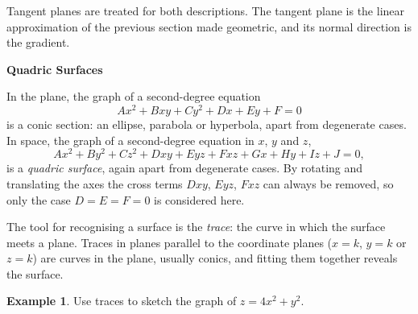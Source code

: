 \documentclass[11pt,a4paper]{article}
\theoremstyle{definition}
\newtheorem{exa}[thm]{Example}
\newcommand{\subhead}[1]{%
  \par\medskip\noindent\textbf{#1}\par\nobreak\smallskip}
\begin{document}
Tangent planes are treated for both descriptions. The tangent plane is the
linear approximation of the previous section made geometric, and its normal
direction is the gradient.

\subhead{Quadric Surfaces}

In the plane, the graph of a second-degree equation
\[Ax^2 + Bxy + Cy^2 + Dx + Ey + F = 0\]
is a conic section: an ellipse, parabola or hyperbola, apart from degenerate
cases. In space, the graph of a second-degree equation in $x$, $y$ and $z$,
\[Ax^2 + By^2 + Cz^2 + Dxy + Eyz + Fxz + Gx + Hy + Iz + J =0,\]
is a \emph{quadric surface}, again apart from degenerate cases. By rotating and
translating the axes the cross terms $Dxy$, $Eyz$, $Fxz$ can always be removed,
so only the case $D = E = F = 0$ is considered here.

The tool for recognising a surface is the \emph{trace}: the curve in which the
surface meets a plane. Traces in planes parallel to the coordinate planes
($x = k$, $y = k$ or $z = k$) are curves in the plane, usually conics, and
fitting them together reveals the surface.

\begin{exa}
\label{ex:tracesparaboloid}
Use traces to sketch the graph of $z = 4x^2 + y^2$.
\end{exa}
\end{document}
